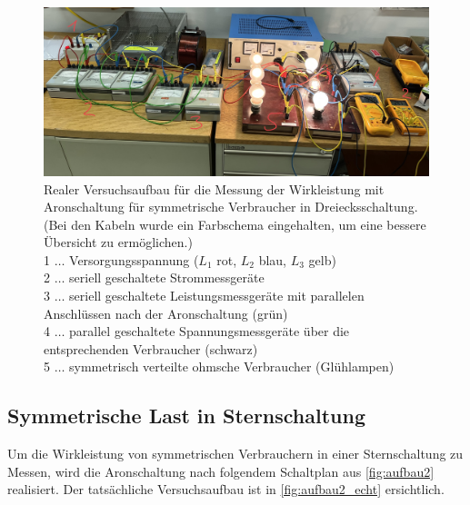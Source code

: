 \documentclass[12pt,english,ngerman]{scrartcl}
\begin{document}
\begin{figure}[H]
	\begin{center}
		\includegraphics[width = \textwidth]{./figures/aufbau1_echt.png}
	\end{center}
	\caption[Realer Versuchsaufbau für die Messung der Wirkleistung mit Aronschaltung für symmetrische
	Verbraucher in Dreiecksschaltung]
	{Realer Versuchsaufbau für die Messung der Wirkleistung mit Aronschaltung für symmetrische
	Verbraucher in Dreiecksschaltung. (Bei den Kabeln wurde ein Farbschema eingehalten, um eine bessere Übersicht zu ermöglichen.) \\
	1 \(\dots\) Versorgungsspannung ($L_1$ rot, $L_2$ blau, $L_3$ gelb) \\
	2 \(\dots\) seriell geschaltete Strommessgeräte  \\
	3 \(\dots\) seriell geschaltete Leistungsmessgeräte mit parallelen Anschlüssen nach der Aronschaltung (grün)\\
	4 \(\dots\) parallel geschaltete Spannungsmessgeräte über die entsprechenden Verbraucher (schwarz)\\
	5 \(\dots\) symmetrisch verteilte ohmsche Verbraucher (Glühlampen)}
	\label{fig:aufbau1_echt}
\end{figure}

\subsection{Symmetrische Last in Sternschaltung}

Um die Wirkleistung von symmetrischen Verbrauchern in einer Sternschaltung zu Messen, wird die Aronschaltung
nach folgendem Schaltplan aus \autoref{fig:aufbau2} realisiert. 
Der tatsächliche Versuchsaufbau ist in \autoref{fig:aufbau2_echt} ersichtlich.
\end{document}
